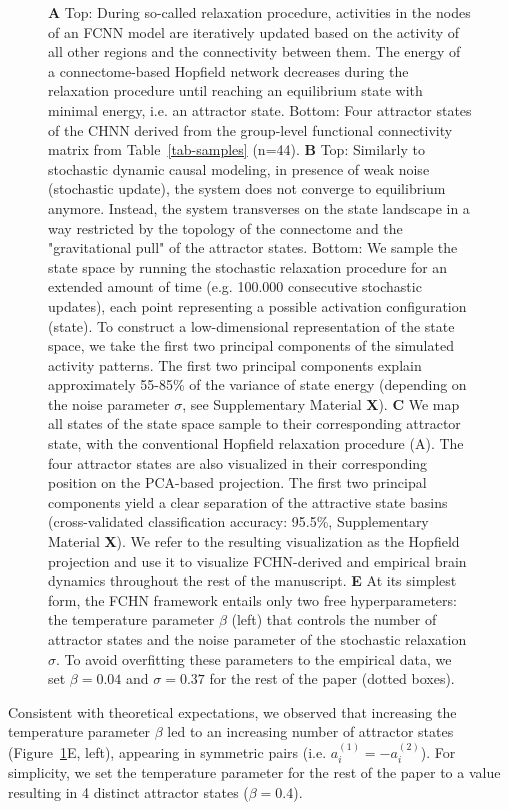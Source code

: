 \documentclass{article}
\begin{document}
\begin{figure}[!htbp]
{\textbf{A} Top: During so-called relaxation procedure, activities in the nodes of an FCNN model are iteratively updated based on the activity of all other regions and the connectivity between them. The energy of a
connectome-based Hopfield network decreases during the relaxation procedure until reaching an equilibrium state with
minimal energy, i.e. an attractor state. Bottom: Four attractor states of the CHNN derived from the
group-level functional connectivity matrix from Table~\ref{tab-samples} (n=44).
\textbf{B} Top: Similarly to stochastic dynamic causal modeling, in presence of weak noise (stochastic update), the system
does not converge to equilibrium anymore. Instead, the system transverses on the state landscape in a way
restricted by the topology of the connectome and the "gravitational pull" of the attractor states. Bottom: We sample
the state space by running the stochastic relaxation procedure for an extended amount of time (e.g. 100.000 consecutive
stochastic updates), each point representing a possible activation configuration (state). To construct a
low-dimensional representation of the state space, we take the first two principal components of the simulated activity
patterns. The first two principal components explain approximately 55-85\% of the variance of state energy (depending
on the noise parameter $\sigma$, see Supplementary Material \textbf{X}).
\textbf{C} We map all states of the state space sample to their corresponding attractor state, with the conventional
Hopfield relaxation procedure (A). The four attractor states are also visualized in their corresponding position on the
PCA-based projection. The first two principal components yield a clear separation of the attractive state basins
(cross-validated classification accuracy: 95.5\%, Supplementary Material \textbf{X}). We refer to the resulting visualization
as the Hopfield projection and use it to visualize FCHN-derived and empirical brain dynamics throughout the rest of
the manuscript.
\textbf{E} At its simplest form, the FCHN framework entails only two free hyperparameters: the temperature parameter
$\beta$ (left) that controls the number of attractor states and the noise parameter of the stochastic relaxation
$\sigma$. To avoid overfitting these parameters to the empirical data, we set $\beta=0.04$ and $\sigma=0.37$ for the
rest of the paper  (dotted boxes).}
\label{attractors}
\end{figure}

Consistent with theoretical expectations, we observed that increasing the temperature parameter $\beta$ led to an
increasing number of attractor states (Figure~\ref{attractors}E, left), appearing in symmetric pairs
(i.e. $a_i^{(1)} = -a_i^{(2)}$). For simplicity, we set the temperature parameter for the rest of the paper to a value
resulting in 4 distinct attractor states ($\beta=0.4$).
\end{document}
